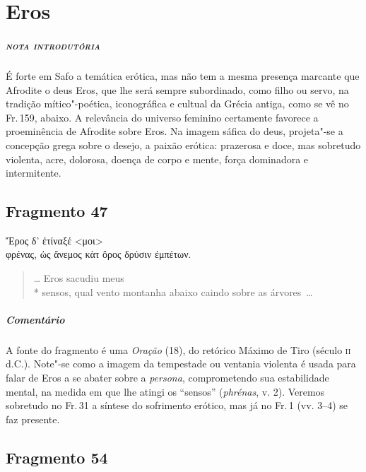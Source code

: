 \chapter{Eros}

\paragraph{\textsc{nota introdutória}} 
É forte em Safo a temática erótica, mas não tem a mesma presença marcante que
Afrodite o deus Eros, que lhe será sempre subordinado, como filho ou servo, na
tradição mítico"-poética, iconográfica e cultual da Grécia antiga, como se vê no
Fr.\,159, abaixo. A relevância do universo feminino certamente favorece a
proeminência de Afrodite sobre Eros. Na imagem sáfica do deus, projeta"-se a
concepção grega sobre o desejo, a paixão erótica: prazerosa e doce, mas
sobretudo violenta, acre, dolorosa, doença de corpo e mente, força dominadora e
intermitente.

\section{Fragmento 47}

\begin{gkverse}
Ἔρος δ’ ἐτίναξέ <μοι>\\
φρένας, ὠς ἄνεμος κὰτ ὄρος δρύσιν ἐμπέτων.
\end{gkverse}

\begin{verse}
\ldots{} Eros sacudiu meus\\*
sensos, qual vento montanha abaixo caindo sobre as \mbox{árvores \ldots{}}
\end{verse}

\paragraph{Comentário} A fonte do fragmento é uma \textit{Oração} (18), do retórico Máximo de Tiro (século \textsc{ii} d.C.).
Note"-se como a imagem da tempestade ou ventania violenta é usada para falar de Eros a se abater sobre a \textit{persona}, comprometendo sua estabilidade mental, na medida em que lhe atingi os ``sensos'' (\textit{phrénas}, v. 2). Veremos sobretudo no Fr.\,31 a síntese do sofrimento erótico, mas já no Fr.\,1 (vv. 3--4) se faz presente.



\pagebreak
\section{Fragmento 54}

